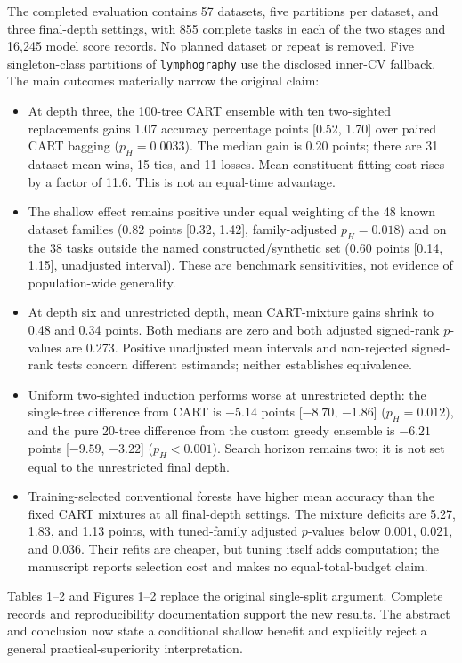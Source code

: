 The completed evaluation contains 57 datasets, five partitions per dataset, and three final-depth settings, with 855 complete tasks in each of the two stages and 16,245 model score records. No planned dataset or repeat is removed. Five singleton-class partitions of \texttt{lymphography} use the disclosed inner-CV fallback. The main outcomes materially narrow the original claim:
\begin{itemize}
\item At depth three, the 100-tree CART ensemble with ten two-sighted replacements gains 1.07 accuracy percentage points [0.52, 1.70] over paired CART bagging ($p_H=0.0033$). The median gain is 0.20 points; there are 31 dataset-mean wins, 15 ties, and 11 losses. Mean constituent fitting cost rises by a factor of 11.6. This is not an equal-time advantage.
\item The shallow effect remains positive under equal weighting of the 48 known dataset families (0.82 points [0.32, 1.42], family-adjusted $p_H=0.018$) and on the 38 tasks outside the named constructed/synthetic set (0.60 points [0.14, 1.15], unadjusted interval). These are benchmark sensitivities, not evidence of population-wide generality.
\item At depth six and unrestricted depth, mean CART-mixture gains shrink to 0.48 and 0.34 points. Both medians are zero and both adjusted signed-rank $p$-values are 0.273. Positive unadjusted mean intervals and non-rejected signed-rank tests concern different estimands; neither establishes equivalence.
\item Uniform two-sighted induction performs worse at unrestricted depth: the single-tree difference from CART is $-5.14$ points [$-8.70$, $-1.86$] ($p_H=0.012$), and the pure 20-tree difference from the custom greedy ensemble is $-6.21$ points [$-9.59$, $-3.22$] ($p_H<0.001$). Search horizon remains two; it is not set equal to the unrestricted final depth.
\item Training-selected conventional forests have higher mean accuracy than the fixed CART mixtures at all final-depth settings. The mixture deficits are 5.27, 1.83, and 1.13 points, with tuned-family adjusted $p$-values below 0.001, 0.021, and 0.036. Their refits are cheaper, but tuning itself adds computation; the manuscript reports selection cost and makes no equal-total-budget claim.
\end{itemize}
Tables 1--2 and Figures 1--2 replace the original single-split argument. Complete records and reproducibility documentation support the new results. The abstract and conclusion now state a conditional shallow benefit and explicitly reject a general practical-superiority interpretation.

